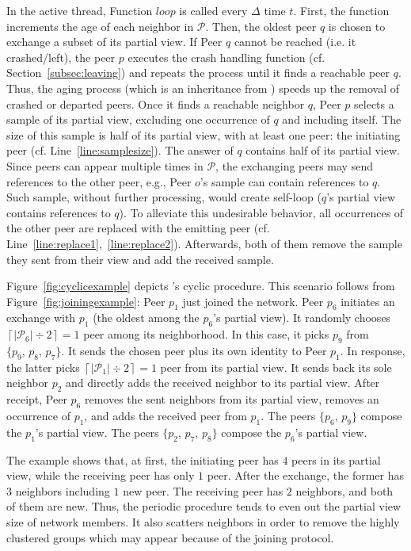 In the active thread, Function $loop$ is called every $\Delta$ time
$t$. First, the function increments the age of each neighbor in
$\mathcal{P}$. Then, the oldest peer $q$ is chosen to exchange a subset of its
partial view. If Peer $q$ cannot be reached (i.e. it crashed/left), the peer
$p$ executes the crash handling function (cf. Section~\ref{subsec:leaving}) and
repeats the process until it finds a reachable peer $q$. Thus, the aging
process (which is an inheritance from \CYCLON) speeds up the removal of
crashed or departed peers. Once it finds a reachable neighbor $q$, Peer $p$
selects a sample of its partial view, excluding one occurrence of $q$ and
including itself. The size of this sample is half of its partial view, with at
least one peer: the initiating peer (cf. Line~\ref{line:samplesize}). The
answer of $q$ contains half of its partial view. Since peers can appear
multiple times in $\mathcal{P}$, the exchanging peers may send references to
the other peer, e.g., Peer $o$'s sample can contain references to $q$. Such
sample, without further processing, would create self-loop ($q$'s partial view
contains references to $q$). To alleviate this undesirable behavior, all
occurrences of the other peer are replaced with the emitting peer
(cf. Line~\ref{line:replace1},~\ref{line:replace2}).  Afterwards, both of them
remove the sample they sent from their view and add the received sample.

Figure~\ref{fig:cyclicexample} depicts \SPRAY's cyclic
procedure. This scenario follows from Figure~\ref{fig:joiningexample}:
Peer $p_1$ just joined the network. Peer $p_6$ initiates an exchange
with $p_1$ (the oldest among the $p_6$'s partial view). It randomly
chooses $\left\lceil{|\mathcal{P}_6|\div 2}\right\rceil = 1$ peer
among its neighborhood. In this case, it picks $p_9$ from
$\{p_9,\,p_8,\,p_7\}$.  It sends the chosen peer plus its own identity
to Peer $p_1$. In response, the latter picks
$\left\lceil{|\mathcal{P}_1|\div 2}\right\rceil = 1$ peer from its
partial view. It sends back its sole neighbor $p_2$ and directly adds
the received neighbor to its partial view. After receipt, Peer $p_6$
removes the sent neighbors from its partial view, removes an
occurrence of $p_1$, and adds the received peer from $p_1$. The peers
$\{p_6,\,p_9\}$ compose the $p_1$'s partial view. The peers
$\{p_2,\,p_7,\,p_8\}$ compose the $p_6$'s partial view.

The example shows that, at first, the initiating peer has $4$ peers in
its partial view, while the receiving peer has only $1$ peer.
After the exchange, the former has $3$ neighbors including $1$ new
peer. The receiving peer has $2$ neighbors, and both of them are
new. Thus, the periodic procedure tends to even out the partial view
size of network members. It also scatters neighbors in order to remove
the highly clustered groups which may appear because of the joining
protocol.

